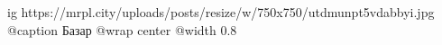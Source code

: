  
 
 
 
 

\ifcmt
  ig https://mrpl.city/uploads/posts/resize/w/750x750/utdmunpt5vdabbyi.jpg
	@caption Базар
  @wrap center
  @width 0.8
\fi
